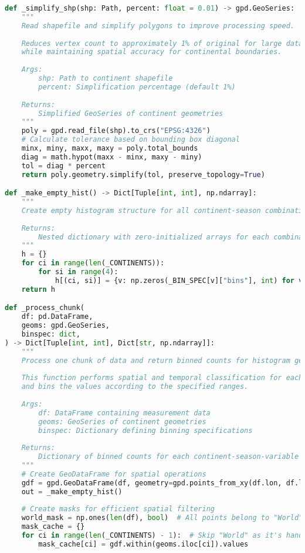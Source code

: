 \begin{lstlisting}[language=Python, caption=Histogram Generation Algorithm, label=alg:step03_histos]
def _simplify_shp(shp: Path, percent: float = 0.01) -> gpd.GeoSeries:
    """
    Read shapefile and simplify polygons to improve processing speed.
    
    Reduces vertex count to approximately 1% of original for large datasets
    while maintaining spatial accuracy for continental boundaries.
    
    Args:
        shp: Path to continent shapefile
        percent: Simplification percentage (default 1%)
        
    Returns:
        Simplified GeoSeries of continent geometries
    """
    poly = gpd.read_file(shp).to_crs("EPSG:4326")
    # Calculate tolerance based on bounding box diagonal
    minx, miny, maxx, maxy = poly.total_bounds
    diag = math.hypot(maxx - minx, maxy - miny)
    tol = diag * percent
    return poly.geometry.simplify(tol, preserve_topology=True)

def _make_empty_hist() -> Dict[Tuple[int, int], np.ndarray]:
    """
    Create empty histogram structure for all continent-season combinations.
    
    Returns:
        Nested dictionary with zero-initialized arrays for each combination
    """
    h = {}
    for ci in range(len(_CONTINENTS)):
        for si in range(4):
            h[(ci, si)] = {v: np.zeros(_BIN_SPEC[v]["bins"], int) for v in _VARS}
    return h

def _process_chunk(
    df: pd.DataFrame,
    geoms: gpd.GeoSeries,
    binspec: dict,
) -> Dict[Tuple[int, int], Dict[str, np.ndarray]]:
    """
    Process one chunk of data and return binned counts for histogram generation.
    
    This function performs spatial and temporal classification for each measurement
    and bins the values according to the specified ranges.
    
    Args:
        df: DataFrame containing measurement data
        geoms: GeoSeries of continent geometries
        binspec: Dictionary defining binning specifications
        
    Returns:
        Dictionary of binned counts for each continent-season-variable combination
    """
    # Create GeoDataFrame for spatial operations
    gdf = gpd.GeoDataFrame(df, geometry=gpd.points_from_xy(df.lon, df.lat), crs="EPSG:4326")
    out = _make_empty_hist()
    
    # Create masks for efficient spatial filtering
    world_mask = np.ones(len(df), bool)  # All points belong to "World"
    mask_cache = {}
    for ci in range(len(_CONTINENTS) - 1):  # Skip "World" as it's handled separately
        mask_cache[ci] = gdf.within(geoms.iloc[ci]).values


\end{lstlisting}
